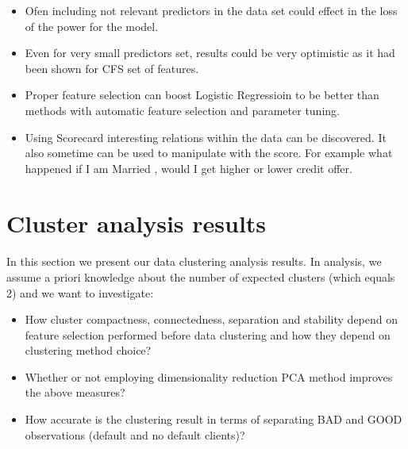 \documentclass[10pt]{article}\usepackage[]{graphicx}\usepackage[]{color}
\begin{document}
\begin{itemize}

\item Ofen including not relevant predictors in the data set could effect in the loss of the power for the model.

\item Even for very small predictors set, results could be very optimistic as it had been shown for CFS set of features. 

\item Proper feature selection can boost Logistic Regressioin to be better than methods with automatic feature selection and parameter tuning. 

\item Using Scorecard interesting relations within the data can be discovered. It also sometime can be used to manipulate with the score. For example what happened if I am Married , would I get higher or lower credit offer. 

\end{itemize}





\clearpage 
\section{Cluster analysis results}
\paragraph{}
In this section we present our data clustering analysis results. In analysis, we assume
a priori knowledge about the number of expected clusters (which equals 2) and 
we want to investigate:
\begin{itemize}
\item How cluster compactness, connectedness, separation and stability depend on
feature selection performed before data clustering and how they depend on clustering method choice?
\item Whether or not employing dimensionality reduction PCA method improves the above
measures?
\item How accurate is the clustering result in terms of separating BAD and GOOD
observations (default and no default clients)?
\end{itemize}
\end{document}

